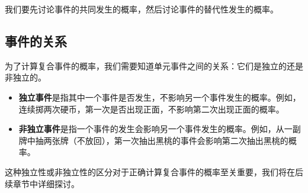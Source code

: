 我们要先讨论事件的共同发生的概率，然后讨论事件的替代性发生的概率。

\subsection{事件的关系}

为了计算复合事件的概率，我们需要知道单元事件之间的关系：它们是独立的还是非独立的。

\begin{itemize}
\item \textbf{独立事件}是指其中一个事件是否发生，不影响另一个事件发生的概率。例如，连续掷两次硬币，第一次是否出现正面，不影响第二次出现正面的概率。
\item \textbf{非独立事件}是指一个事件的发生会影响另一个事件发生的概率。例如，从一副牌中抽两张牌（不放回），第一次抽出黑桃的事件会影响第二次抽出黑桃的概率。
\end{itemize}

这种独立性或非独立性的区分对于正确计算复合事件的概率至关重要，我们将在后续章节中详细探讨。

\begin{center}
\end{center} 
